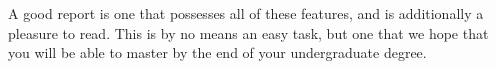 A good report is one that possesses all of these features, and is additionally a pleasure to read. This is by no means an easy task, but one that we hope that you will be able to master by the end of your undergraduate degree.
































